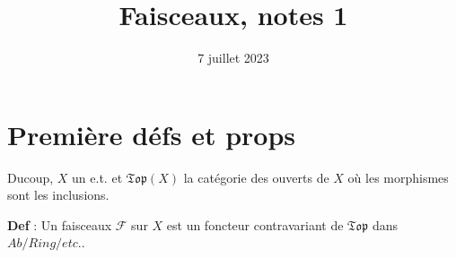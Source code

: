 \documentclass[12pt]{article}
\title{Faisceaux, notes 1}
\date{7 juillet 2023}
\newcommand{\F}{\mathcal{F}}
\newcommand{\Topo}{\mathfrak{T}\mathfrak{o}\mathfrak{p}}
\begin{document}
\tableofcontents
\maketitle

\section{Première défs et props}
Ducoup, $X$ un e.t. et $\Topo(X)$ la catégorie des ouverts de $X$ où les morphismes sont les inclusions.

\textbf{\color{wgrey} Def} : Un faisceaux $\F$ sur $X$ est un foncteur contravariant de $\Topo$ dans $Ab/Ring/etc.$.
\end{document}
